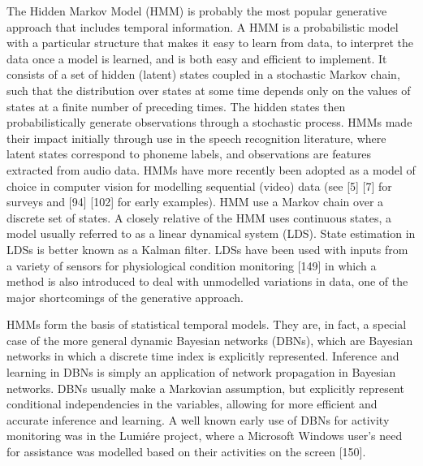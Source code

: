 The Hidden Markov Model (HMM) is probably the most popular generative approach that includes temporal information. A HMM is a probabilistic model with a particular structure that makes it easy to learn from data, to interpret the data once a model is learned, and is both easy and efficient to implement. It consists of a set of hidden (latent) states coupled in a stochastic Markov chain, such that the distribution over states at some time depends only on the values of states at a finite number of preceding times. The hidden states then probabilistically generate observations through a stochastic process. HMMs made their impact initially through use in the speech recognition literature, where latent states correspond to phoneme labels, and observations are features extracted from audio data. HMMs have more recently been adopted as a model of choice in computer vision for modelling sequential (video) data (see [5] [7] for surveys and [94] [102] for early examples). HMM use a Markov chain over a discrete set of states. A closely relative of the HMM uses continuous states, a model usually referred to as a linear dynamical system (LDS). State estimation in LDSs is better known as a Kalman filter. LDSs have been used with inputs from a variety of sensors for physiological condition monitoring [149] in which a method is also introduced to deal with unmodelled variations in data, one of the major shortcomings of the generative approach.

HMMs form the basis of statistical temporal models. They are, in fact, a special case of the more general dynamic Bayesian networks (DBNs), which are Bayesian networks in which a discrete time index is explicitly represented. Inference and learning in DBNs is simply an application of network propagation in Bayesian networks. DBNs usually make a Markovian assumption, but explicitly represent conditional independencies in the variables, allowing for more efficient and accurate inference and learning. A well known early use of DBNs for activity monitoring was in the Lumi\'ere project,
where a Microsoft Windows user’s need for assistance was modelled based on their activities on the screen [150]. 

